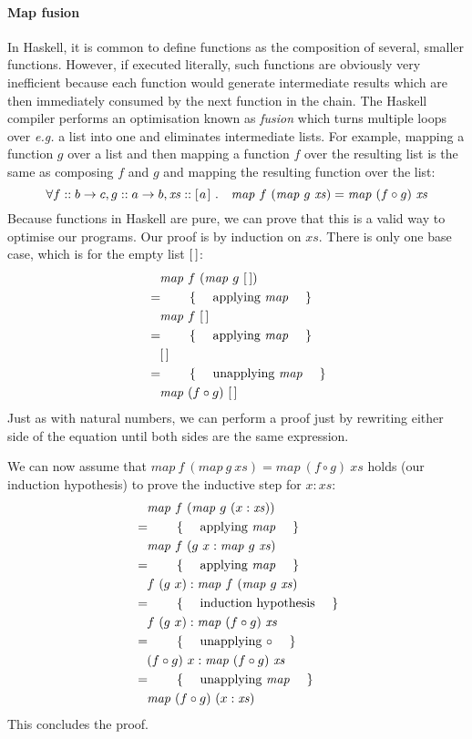 \paragraph{Map fusion} In Haskell, it is common to define functions as the composition of several, smaller functions. However, if executed literally, such functions are obviously very inefficient because each function would generate intermediate results which are then immediately consumed by the next function in the chain. The Haskell compiler performs an optimisation known as \emph{fusion} which turns multiple loops over \emph{e.g.} a list into one and eliminates intermediate lists. For example, mapping a function $g$ over a list and then mapping a function $f$ over the resulting list is the same as composing $f$ and $g$ and mapping the resulting function over the list:
\begin{displaymath}
\forall f :: b \to c, g :: a \to b, \mathit{xs} :: [\mskip1.5mu a \mskip1.5mu]~.\quad \mathit{map}~f~(\mathit{map}~g~\mathit{xs}) = \mathit{map}~(f \circ g)~\mathit{xs}
\end{displaymath}
Because functions in Haskell are pure, we can prove that this is a valid way to optimise our programs. Our proof is by induction on $\mathit{xs}$. There is only one base case, which is for the empty list $\hslist{}$:
\begin{align*}
\expr{\mathit{map}~f~(\mathit{map}~g~\hslist{})}
\hint{applying $\mathit{map}$}
\expr{\mathit{map}~f~\hslist{}}
\hint{applying $\mathit{map}$}
\expr{\hslist{}}
\hint{unapplying $\mathit{map}$}
\lastexpr{\mathit{map}~(f \circ g)~\hslist{}}
\end{align*}
Just as with natural numbers, we can perform a proof just by rewriting either side of the equation until both sides are the same expression. 

We can now assume that $\mathit{map}~f~(\mathit{map}~g~\mathit{xs}) = \mathit{map}~(f \circ g)~\mathit{xs}$ holds (our induction hypothesis) to prove the inductive step for $x : xs$:
\begin{align*}
&\quad \mathit{map}~f~(\mathit{map}~g~(x:\mathit{xs}))\\
&=\qquad\text{\{\quad\ applying $\mathit{map}$ \quad\}}\\
&\quad \mathit{map}~f~(g~x : \mathit{map}~g~\mathit{xs})\\
&=\qquad\text{\{\quad\ applying $\mathit{map}$ \quad\}}\\
&\quad f~(g~x) : \mathit{map}~f~(\mathit{map}~g~\mathit{xs})\\
&=\qquad\text{\{\quad\ induction hypothesis \quad\}}\\
&\quad f~(g~x) : \mathit{map}~(f \circ g)~\mathit{xs}\\
&=\qquad\text{\{\quad\ unapplying $\circ$ \quad\}}\\
&\quad (f \circ g)~x : \mathit{map}~(f \circ g)~\mathit{xs}\\
&=\qquad\text{\{\quad\ unapplying $\mathit{map}$ \quad\}}\\
&\quad \mathit{map}~(f \circ g)~(x : \mathit{xs})
\end{align*}
This concludes the proof.